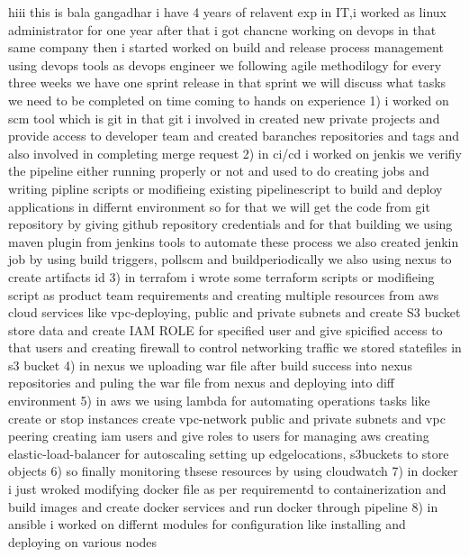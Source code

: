 


   hiii this is bala gangadhar i have 4 years of relavent exp in IT,i worked as linux administrator for one year after that i got chancne working on devops in that same company then i started 
   worked on build and release process management using devops tools as devops engineer 
  we following  agile methodilogy for every three weeks we have one sprint release in that sprint we will discuss what tasks we need to be completed on time
   coming to hands on experience  
  1) i worked on scm tool which is  git  in that git i  involved in created new private projects and provide access to developer team and created baranches repositories and 
	  tags and also involved in completing merge request
  2) in ci/cd i worked on jenkis we verifiy the pipeline either running properly or not  and used to do creating jobs and  writing  pipline scripts or modifieing existing
      pipelinescript to build and deploy applications in differnt environment so for that we will get the code from git repository by giving github repository credentials
	  and for that building  we using maven plugin from jenkins tools to automate these process we also created jenkin job by  using build triggers, pollscm and buildperiodically 
	  we also using nexus to create artifacts id 
  3) in terrafom i wrote some terraform scripts or modifieing script as product team requirements and creating multiple resources from aws cloud services like  vpc-deploying,
      public and private subnets and create S3 bucket store data and create IAM ROLE for specified user and give spicified  access to that users and creating firewall to control
	  networking traffic  we stored statefiles in s3 bucket
  4) in nexus we uploading war file after build success into nexus repositories and puling the war file from nexus and deploying into diff environment
  5) in aws we  using
	  lambda for automating operations tasks like create or stop instances
      create vpc-network public and private subnets and vpc peering
	  creating iam users and give roles to users for managing aws
	  creating elastic-load-balancer  for autoscaling
	  setting up edgelocations, s3buckets to store objects
  6) so finally  monitoring thsese resources by using cloudwatch
  7) in docker i just wroked modifying docker file as per requirementd to containerization and build images and create docker services and run docker through  pipeline 
  8) in ansible i worked on differnt modules for configuration like installing and deploying  on various nodes
	 
	 
	 
	
	
	 
	
				
